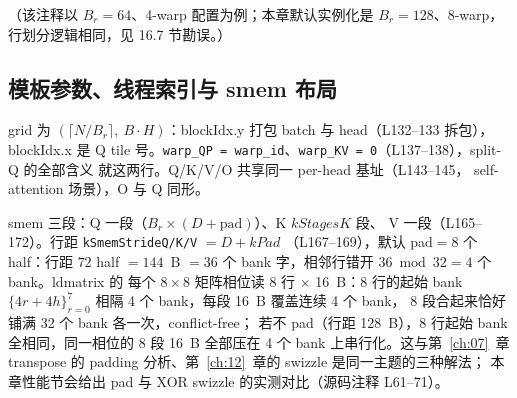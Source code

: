 （该注释以 $B_r{=}64$、4-warp 配置为例；本章默认实例化是
$B_r{=}128$、8-warp，行划分逻辑相同，见 16.7 节勘误。）

\subsection{模板参数、线程索引与 smem 布局}





grid 为 $(\lceil N/B_r\rceil,\ B\cdot H)$：blockIdx.y 打包 batch 与
head（L132--133 拆包），blockIdx.x 是 Q tile 号。\texttt{warp\_QP =
warp\_id}、\texttt{warp\_KV = 0}（L137--138），split-Q 的全部含义
就这两行。Q/K/V/O 共享同一 per-head 基址（L143--145，
self-attention 场景），O 与 Q 同形。



smem 三段：Q 一段（$B_r\times(D{+}\mathrm{pad})$）、K $kStagesK$ 段、
V 一段（L165--172）。行距 \texttt{k\allowbreak{}Smem\allowbreak{}Stride\allowbreak{}Q/\allowbreak{}K/\allowbreak{}V} $= D + kPad$
（L167--169），默认 pad$=$8 个 half：行距 $72$ half $=144$~B
$=36$ 个 bank 字，相邻行错开 $36 \bmod 32 = 4$ 个 bank。ldmatrix 的
每个 $8\times8$ 矩阵相位读 8 行 $\times$ 16~B：8 行的起始 bank
$\{4r{+}4h\}_{r=0}^{7}$ 相隔 4 个 bank，每段 16~B 覆盖连续 4 个 bank，
8 段合起来恰好铺满 32 个 bank 各一次，conflict-free；
若不 pad（行距 128~B），8 行起始 bank 全相同，同一相位的 8 段 16~B
全部压在 4 个 bank 上串行化。这与第~\ref{ch:07}~章 transpose 的
padding 分析、第~\ref{ch:12}~章的 swizzle 是同一主题的三种解法；
本章性能节会给出 pad 与 XOR swizzle 的实测对比（源码注释 L61--71）。


